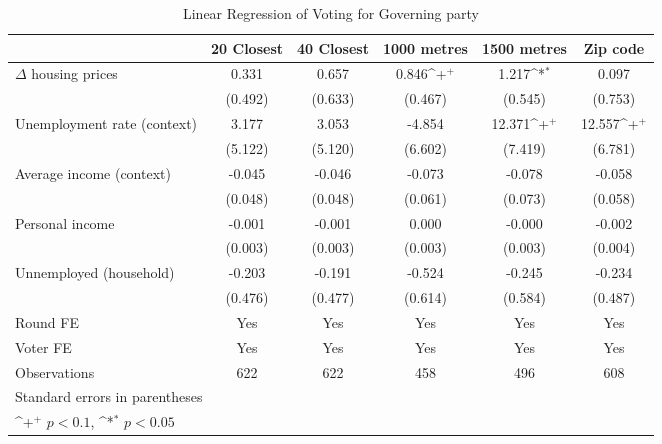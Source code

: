 \begin{table}[htbp]\centering
\def\sym#1{\ifmmode^{#1}\else\(^{#1}\)\fi}
\caption{Linear Regression of Voting for Governing party } \footnotesize \label{logit}
\begin{tabular}{l*{5}{c}}
\hline\hline
                    &\multicolumn{1}{c}{20 Closest}&\multicolumn{1}{c}{40 Closest}&\multicolumn{1}{c}{1000 metres}&\multicolumn{1}{c}{1500 metres}&\multicolumn{1}{c}{Zip code}\\
\hline
$\Delta$ housing prices&       0.331       &       0.657       &       0.846\sym{+}&       1.217\sym{*}&       0.097       \\
                    &     (0.492)       &     (0.633)       &     (0.467)       &     (0.545)       &     (0.753)       \\
[1em]
Unemployment rate (context)&       3.177       &       3.053       &      -4.854       &      12.371\sym{+}&      12.557\sym{+}\\
                    &     (5.122)       &     (5.120)       &     (6.602)       &     (7.419)       &     (6.781)       \\
[1em]
Average income (context)&      -0.045       &      -0.046       &      -0.073       &      -0.078       &      -0.058       \\
                    &     (0.048)       &     (0.048)       &     (0.061)       &     (0.073)       &     (0.058)       \\
[1em]
Personal income     &      -0.001       &      -0.001       &       0.000       &      -0.000       &      -0.002       \\
                    &     (0.003)       &     (0.003)       &     (0.003)       &     (0.003)       &     (0.004)       \\
[1em]
Unnemployed (household)&      -0.203       &      -0.191       &      -0.524       &      -0.245       &      -0.234       \\
                    &     (0.476)       &     (0.477)       &     (0.614)       &     (0.584)       &     (0.487)       \\
[1em]
\hline  Round FE    &         Yes       &         Yes       &         Yes       &         Yes       &         Yes       \\
[1em]
Voter FE            &         Yes       &         Yes       &         Yes       &         Yes       &         Yes       \\
\hline
Observations        &         622       &         622       &         458       &         496       &         608       \\
\hline\hline
\multicolumn{6}{l}{\footnotesize Standard errors in parentheses}\\
\multicolumn{6}{l}{\footnotesize \sym{+} \(p<0.1\), \sym{*} \(p<0.05\)}\\
\end{tabular}
\end{table}
